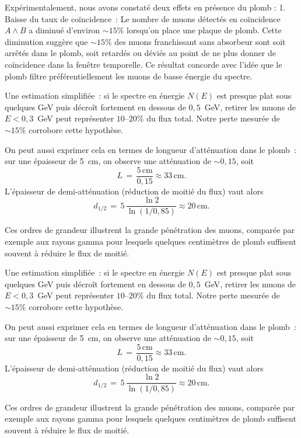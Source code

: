 \documentclass[a4paper,12pt,twoside]{article}
\begin{document}
Expérimentalement, nous avons constaté deux effets en présence du plomb :
1. Baisse du taux de coïncidence~: Le nombre de muons détectés en coïncidence $A \land B$ a diminué d'environ $\sim15\%$ lorsqu'on place une plaque de plomb. Cette diminution suggère que $\sim15\%$ des muons franchissant sans absorbeur sont soit arrêtés dans le plomb, soit retardés ou déviés au point de ne plus donner de coïncidence dans la fenêtre temporelle. Ce résultat concorde avec l'idée que le plomb filtre préférentiellement les muons de basse énergie du spectre. 

Une estimation simplifiée~: si le spectre en énergie $N(E)$ est presque plat sous quelques GeV puis décroît fortement en dessous de $0{,}5$~GeV, retirer les muons de $E<0{,}3$~GeV peut représenter $10$--$20\%$ du flux total. Notre perte mesurée de $\sim15\%$ corrobore cette hypothèse. 

On peut aussi exprimer cela en termes de longueur d’atténuation dans le plomb~: sur une épaisseur de 5~cm, on observe une atténuation de $\sim0{,}15$, soit 
\[
  L \,=\, \frac{5\,\mathrm{cm}}{0{,}15}\approx33\,\mathrm{cm} .
\]
L'épaisseur de demi-atténuation (réduction de moitié du flux) vaut alors
\[
  d_{1/2} \,=\, 5\,\frac{\ln2}{\ln(1/0{,}85)} \approx20\,\mathrm{cm} .
\]

Ces ordres de grandeur illustrent la grande pénétration des muons, comparée par exemple aux rayons gamma pour lesquels quelques centimètres de plomb suffisent souvent à réduire le flux de moitié.


Une estimation simplifiée~: si le spectre en énergie $N(E)$ est presque plat sous quelques GeV puis décroît fortement en dessous de $0{,}5$~GeV, retirer les muons de $E<0{,}3$~GeV peut représenter $10$--$20\%$ du flux total. Notre perte mesurée de $\sim15\%$ corrobore cette hypothèse. 

On peut aussi exprimer cela en termes de longueur d'atténuation dans le plomb~: sur une épaisseur de 5~cm, on observe une atténuation de $\sim0{,}15$, soit 
\[
  L \,=\, \frac{5\,\mathrm{cm}}{0{,}15}\approx33\,\mathrm{cm} .
\]
L'épaisseur de demi-atténuation (réduction de moitié du flux) vaut alors
\[
  d_{1/2} \,=\, 5\,\frac{\ln2}{\ln(1/0{,}85)} \approx20\,\mathrm{cm} .
\]

Ces ordres de grandeur illustrent la grande pénétration des muons, comparée par exemple aux rayons gamma pour lesquels quelques centimètres de plomb suffisent souvent à réduire le flux de moitié.
\end{document}

